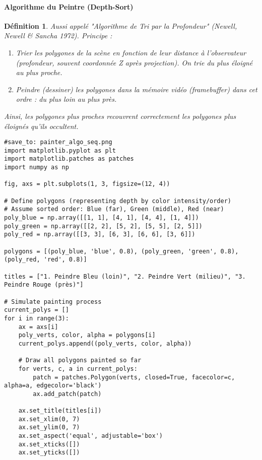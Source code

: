\documentclass{article}
\newtheorem{definition}{Définition}
\begin{document}
{\paragraph{Algorithme du Peintre (Depth-Sort)}
\begin{definition}
Aussi appelé "Algorithme de Tri par la Profondeur" (Newell, Newell \& Sancha 1972).
Principe :
\begin{enumerate}
    \item Trier les polygones de la scène en fonction de leur distance à l'observateur (profondeur, souvent coordonnée Z après projection). On trie du plus éloigné au plus proche.
    \item Peindre (dessiner) les polygones dans la mémoire vidéo (framebuffer) dans cet ordre : du plus loin au plus près.
\end{enumerate}
Ainsi, les polygones plus proches recouvrent correctement les polygones plus éloignés qu'ils occultent.
\end{definition}

\begin{verbatim}
#save_to: painter_algo_seq.png
import matplotlib.pyplot as plt
import matplotlib.patches as patches
import numpy as np

fig, axs = plt.subplots(1, 3, figsize=(12, 4))

# Define polygons (representing depth by color intensity/order)
# Assume sorted order: Blue (far), Green (middle), Red (near)
poly_blue = np.array([[1, 1], [4, 1], [4, 4], [1, 4]])
poly_green = np.array([[2, 2], [5, 2], [5, 5], [2, 5]])
poly_red = np.array([[3, 3], [6, 3], [6, 6], [3, 6]])

polygons = [(poly_blue, 'blue', 0.8), (poly_green, 'green', 0.8), (poly_red, 'red', 0.8)]

titles = ["1. Peindre Bleu (loin)", "2. Peindre Vert (milieu)", "3. Peindre Rouge (près)"]

# Simulate painting process
current_polys = []
for i in range(3):
    ax = axs[i]
    poly_verts, color, alpha = polygons[i]
    current_polys.append((poly_verts, color, alpha))

    # Draw all polygons painted so far
    for verts, c, a in current_polys:
        patch = patches.Polygon(verts, closed=True, facecolor=c, alpha=a, edgecolor='black')
        ax.add_patch(patch)

    ax.set_title(titles[i])
    ax.set_xlim(0, 7)
    ax.set_ylim(0, 7)
    ax.set_aspect('equal', adjustable='box')
    ax.set_xticks([])
    ax.set_yticks([])


\end{verbatim}}
\end{document}
